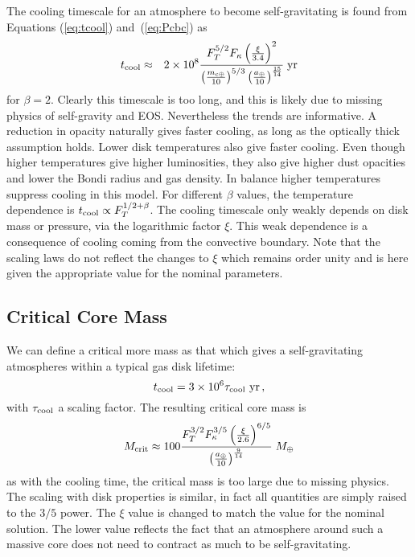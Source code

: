 \documentclass[12pt, preprint,numberedappendix]{emulateapj}
\newcommand{\yr}{\; {\rm yr}}
\newcommand{\Eqs}[2]{Equations (\ref{#1}) and~(\ref{#2})}
\newcommand{\mc}{m_{\rm c \oplus}}
\newcommand{\au}{a_\oplus}
\begin{document}
The cooling timescale  for an atmosphere to become self-gravitating is found from \Eqs{eq:tcool}{eq:Pcbc} as
\begin{eqnarray} 
t_{\rm cool} &\approx & 2 \times 10^8 {F_T^{5/2}  F_\kappa \left(\xi \over 3.4\right)^2  \over \left(\mc \over 10 \right)^{5/3} \left(\au \over 10\right)^{15 \over 14}} \yr
\end{eqnarray} 
for $\beta = 2$.  
Clearly this timescale is too long, and this is likely due to missing physics of self-gravity and EOS.  Nevertheless the trends are informative.   A reduction in opacity naturally gives faster cooling, as long as the optically thick assumption holds.  Lower disk temperatures also give faster cooling.  Even though higher temperatures give higher luminosities, they also give higher dust opacities and lower the Bondi radius and gas density.  In balance higher temperatures suppress cooling in this model.    For different $\beta$ values, the temperature dependence is $t_{\rm cool} \propto F_T^{1/2 + \beta}$.  The cooling timescale only weakly depends on disk mass or pressure, via the  logarithmic factor $\xi$.  This weak dependence is a consequence of cooling coming from the convective boundary.  Note that the scaling laws do not reflect the changes to $\xi$ which remains order unity and is here given the appropriate value for the nominal parameters.



\subsection{Critical Core Mass}\label{sec:critmass}


We can define a critical more mass as that which gives a  self-gravitating atmospheres within a typical gas disk lifetime:
\begin{equation}
t_{\rm cool} = 3 \times 10^6 \tau_{\rm cool} ~{\rm yr} \, ,
\end{equation} 
with $\tau_{\rm cool}$ a scaling factor.  The resulting critical core mass is
\begin{equation}\label{eq:Mcrit}
M_{\rm crit} \approx 100 {F_T^{3/2} F_\kappa^{3/5}   \left(\xi \over 2.6 \right)^{6/5} \over \left(\au \over 10\right)^{9 \over 14}} \; M_\oplus
\end{equation} 
as with the cooling time, the critical mass is too large due to missing physics.  The scaling with disk properties is similar, in fact all quantities are simply raised to the $3/5$ power.  The $\xi$ value is changed to match the value for the nominal solution.  The lower value reflects the fact that an atmosphere around such a massive core does not need to contract as much to be self-gravitating.  
\end{document}
